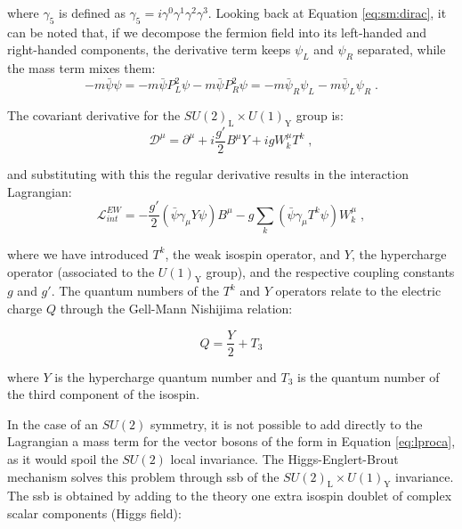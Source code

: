 \noindent where $\gamma_5$ is defined as $\gamma_5 = i \gamma^0 \gamma^1 \gamma^2 \gamma^3 $. Looking back at Equation \ref{eq:sm:dirac}, it can be noted that, if we decompose the fermion field into its left-handed and right-handed components, the derivative term keeps $\psi_L$ and $\psi_R$ separated, while the mass term mixes them:
\begin{equation}
-m \bar \psi \psi = -m \bar \psi P_L^2 \psi - m \bar \psi P_R^2 \psi
	= -m \bar \psi_R \psi_L - m \bar \psi_L \psi_R \; .
\end{equation}


\noindent The covariant derivative for the  $SU(2)_\mathrm{L} \times U(1)_\mathrm{Y}$ group is:
\begin{equation}
\mathcal{D}^{\mu} = \partial^{\mu} + i \frac{g'}{2} B^\mu Y + ig W^\mu_k T^k \; ,
\label{eq:sm:covD}
\end{equation}

\noindent and substituting with this the regular derivative results in the interaction Lagrangian:
\begin{equation}
\mathcal{L}_{int}^{EW} = -\frac{g'}{2} \left( \bar{\psi} \gamma_\mu Y \psi \right) B^\mu - g \sum_k \left( \bar{\psi} \gamma_\mu T^k \psi  \right) W_k^\mu \; ,
\end{equation}

\noindent where we have introduced $T^k$, the weak isospin operator, and $Y$, the hypercharge operator (associated to the $U(1)_\mathrm{Y}$ group), and the respective coupling constants $g$ and $g'$. The quantum numbers of the $T^k$ and $Y$ operators relate to the electric charge $Q$ through the  Gell-Mann Nishijima relation:

\begin{equation}
Q = \frac{Y}{2} + T_3
\label{eq:sm:Q}
\end{equation}

\noindent where $Y$ is the hypercharge quantum number and $T_3$ is the quantum number of the third component of the isospin. 

In the case of an $SU(2)$ symmetry, it is not possible to add directly to the Lagrangian a mass term for the vector bosons of the form in Equation \ref{eq:lproca}, as it would spoil the $SU(2)$ local invariance. The Higgs-Englert-Brout mechanism \cite{Englert:1964et, Higgs:1964pj, Higgs:1964ia} solves this problem through \gls{ssb} of the $SU(2)_\mathrm{L} \times U(1)_\mathrm{Y}$ invariance. The \gls{ssb} is obtained by adding to the theory one extra isospin doublet of complex scalar components (Higgs field):

